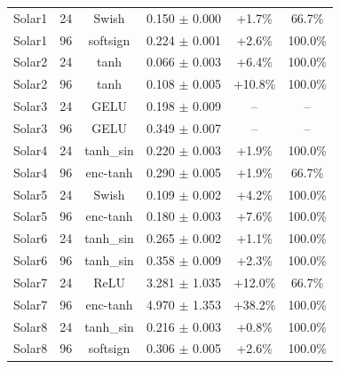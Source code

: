 \begin{table}[t]
{\begin{tabular}{llcccc}
Solar1 & 24 & Swish & 0.150 $\pm$ 0.000 & +1.7\% & 66.7\% \\
Solar1 & 96 & softsign & 0.224 $\pm$ 0.001 & +2.6\% & 100.0\% \\
Solar2 & 24 & tanh & 0.066 $\pm$ 0.003 & +6.4\% & 100.0\% \\
Solar2 & 96 & tanh & 0.108 $\pm$ 0.005 & +10.8\% & 100.0\% \\
Solar3 & 24 & GELU & 0.198 $\pm$ 0.009 & -- & -- \\
Solar3 & 96 & GELU & 0.349 $\pm$ 0.007 & -- & -- \\
Solar4 & 24 & tanh\_sin & 0.220 $\pm$ 0.003 & +1.9\% & 100.0\% \\
Solar4 & 96 & enc-tanh & 0.290 $\pm$ 0.005 & +1.9\% & 66.7\% \\
Solar5 & 24 & Swish & 0.109 $\pm$ 0.002 & +4.2\% & 100.0\% \\
Solar5 & 96 & enc-tanh & 0.180 $\pm$ 0.003 & +7.6\% & 100.0\% \\
Solar6 & 24 & tanh\_sin & 0.265 $\pm$ 0.002 & +1.1\% & 100.0\% \\
Solar6 & 96 & tanh\_sin & 0.358 $\pm$ 0.009 & +2.3\% & 100.0\% \\
Solar7 & 24 & ReLU & 3.281 $\pm$ 1.035 & +12.0\% & 66.7\% \\
Solar7 & 96 & enc-tanh & 4.970 $\pm$ 1.353 & +38.2\% & 100.0\% \\
Solar8 & 24 & tanh\_sin & 0.216 $\pm$ 0.003 & +0.8\% & 100.0\% \\
Solar8 & 96 & softsign & 0.306 $\pm$ 0.005 & +2.6\% & 100.0\% \\
\bottomrule
\end{tabular}%
}
\end{table}
